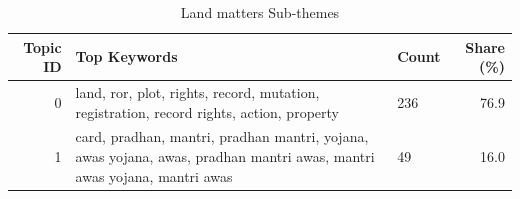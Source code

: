 \begin{table}[htbp]
\centering
\caption{Land matters Sub-themes}
\label{tab:topics_Land_matters}
\begin{tabular}{rlp{7cm}r}
\toprule
Topic ID & Top Keywords & Count & Share (\%) \\
\midrule
0 & land, ror, plot, rights, record, mutation, registration, record rights, action, property & 236 & 76.9 \\
1 & card, pradhan, mantri, pradhan mantri, yojana, awas yojana, awas, pradhan mantri awas, mantri awas yojana, mantri awas & 49 & 16.0 \\
\bottomrule
\end{tabular}
\end{table}